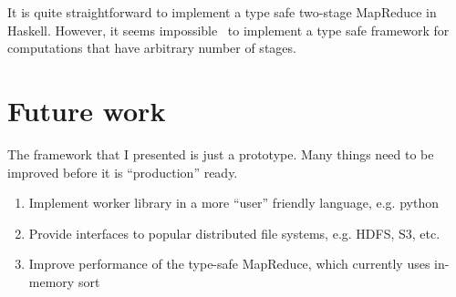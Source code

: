 \documentclass[a4paper]{article}
\begin{document}
It is quite straightforward to implement 
a type safe two-stage MapReduce in Haskell.
However, it seems impossible~\cite{milner1978theory} to 
implement a type safe framework
for computations that have arbitrary number
of stages.

\section{Future work}
The framework that I presented is just a prototype. Many things need 
to be improved before it is ``production'' ready. 
\begin{enumerate}
  \item Implement worker library in a more ``user'' friendly language, e.g. python
  \item Provide interfaces to popular distributed file systems, e.g. HDFS, S3, etc.
  \item Improve performance of the type-safe MapReduce, which currently uses in-memory sort
\end{enumerate}


{}

\end{document}
